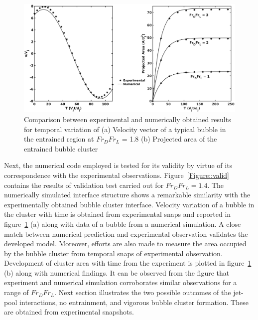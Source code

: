 \begin{figure}
	\centering
	\includegraphics[width=\linewidth]{chapters/jetPool/Figure7}
	\caption{Comparison between experimental and numerically obtained results for temporal variation of (a) Velocity vector of a typical bubble in the entrained region at $Fr_DFr_L$ = 1.8 (b) Projected area of the entrained bubble cluster }
	\label{Figure::valid2}
\end{figure}
Next, the numerical code employed is tested for its validity by virtue of its correspondence with the experimental observations. Figure~\ref{Figure::valid} contains the results of validation test carried out for $Fr_DFr_L = 1.4$. The numerically simulated interface structure shows a remarkable similarity with the experimentally obtained bubble cluster interface. Velocity variation of a bubble in the cluster with time is obtained from experimental snaps and reported in figure~\ref{Figure::valid2} (a) along with data of a bubble from a numerical simulation. A close match between numerical prediction and experimental observation validates the developed model. Moreover, efforts are also made to measure the area occupied by the bubble cluster from temporal snaps of experimental observation. Development of cluster area with time from the experiment is plotted in figure~\ref{Figure::valid2} (b) along with numerical findings. It can be observed from the figure that experiment and numerical simulation corroborates similar observations for a range of $Fr_DFr_L$.
Next section illustrates the two possible outcomes of the jet-pool interactions, no entrainment, and vigorous bubble cluster formation. These are obtained from experimental snapshots. 

